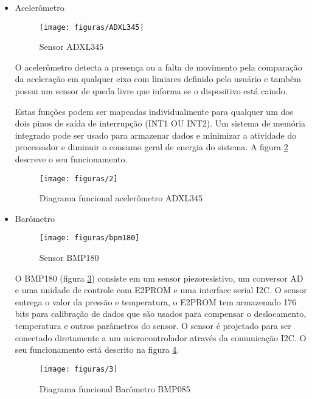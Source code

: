 \begin{itemize}
  \item Acelerômetro
		\begin{figure}[H]
			\centering
			\caption{Sensor ADXL345}
			\label{img:ADXL345}
			\texttt{[image: figuras/ADXL345]}
		\end{figure}

		O acelerômetro detecta a presença ou a falta de movimento pela comparação da aceleração em qualquer eixo com limiares definido pelo usuário e também possui um sensor de queda livre que informa se o dispositivo está caindo.

		Estas funções podem ser mapeadas individualmente para qualquer um dos dois pinos de saída de interrupção (INT1 OU INT2). Um sistema de memória integrado pode ser usado para armazenar dados e minimizar a atividade do processador e diminuir o consumo geral de energia do sistema. A figura \ref{img:acelerometro} descreve o seu funcionamento.

		\begin{figure}[H]
	    \centering
	    \caption[Diagrama funcional acelerômetro ADXL345]{Diagrama funcional acelerômetro ADXL345~\cite{acelerometro}}
	    \label{img:acelerometro}
	    \texttt{[image: figuras/2]}
	  \end{figure}

\pagebreak

  \item Barômetro
		\begin{figure}[H]
			\centering
			\caption{Sensor BMP180}
			\label{img:bpm180}
			\texttt{[image: figuras/bpm180]}
		\end{figure}

		O BMP180 (figura \ref{img:bpm180}) consiste em um sensor piezoresistivo, um conversor AD e uma unidade de controle com E2PROM e uma interface serial I2C. O sensor entrega o valor da pressão e temperatura, o E2PROM tem armazenado 176 bits para calibração de dados que são usados para compensar o deslocamento, temperatura e outros parâmetros do sensor. O sensor é projetado para ser conectado diretamente a um microcontrolador através da comunicação I2C. O seu funcionamento está descrito na figura \ref{img:barometro}.

		\begin{figure}[H]
	    \centering
	    \caption[Diagrama funcional Barômetro BMP085]{Diagrama funcional Barômetro BMP085~\cite{barometro}}
	    \label{img:barometro}
	    \texttt{[image: figuras/3]}
	  \end{figure}
	  

\end{itemize}
